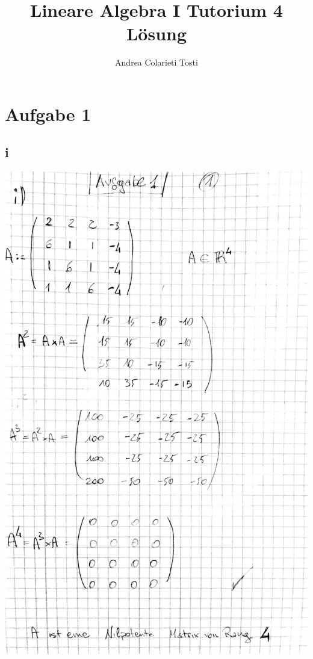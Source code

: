 \documentclass[12pt,a4paper]{article}
\author{Andrea Colarieti Tosti}
\title{Lineare Algebra I Tutorium 4 Lösung}
\begin{document}
\maketitle

\newpage
\section{Aufgabe 1}
\subsection{i}
\includegraphics[scale=0.2]{lat4a_1.jpg} 
\newpage
\end{document}
